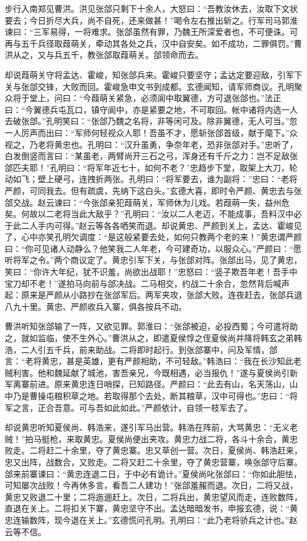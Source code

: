 步行入南郑见曹洪。洪见张郃只剩下十余人，大怒曰：“吾教汝休去，汝取下文状要去；今日折尽大兵，尚不自死，还来做甚！”喝令左右推出斩之。行军司马郭淮谏曰：“三军易得，一将难求。张郃虽然有罪，乃魏王所深爱者也，不可便诛。可再与五千兵径取葭萌关，牵动其各处之兵，汉中自安矣。如不成功，二罪俱罚。”曹洪从之，又与兵五千，教张郃取葭萌关。郃领命而去。

却说葭萌关守将孟达、霍峻，知张郃兵来。霍峻只要坚守；孟达定要迎敌，引军下关与张郃交锋，大败而回。霍峻急申文书到成都。玄德闻知，请军师商议。孔明聚众将于堂上，问曰：“今葭萌关紧急，必须阆中取翼德，方可退张郃也。”法正曰：“今翼德兵屯瓦口，镇守阆中，亦是紧要之地，不可取回。帐中诸将内选一人去破张郃。”孔明笑曰：“张郃乃魏之名将，非等闲可及。除非翼德，无人可当。”忽一人厉声而出曰：“军师何轻视众人耶！吾虽不才，愿斩张郃首级，献于麾下。”众视之，乃老将黄忠也。孔明曰：“汉升虽勇，争奈年老，恐非张郃对手。”忠听了，白发倒竖而言曰：“某虽老，两臂尚开三石之弓，浑身还有千斤之力：岂不足敌张郃匹夫耶！”孔明曰：“将军年近七十，如何不老？”忠趋步下堂，取架上大刀，轮动如飞；壁上硬弓，连拽折两张。孔明曰：“将军要去，谁为副将：”忠曰：“老将严颜，可同我去。但有疏虞，先纳下这白头。”玄德大喜，即时令严颜、黄忠去与张郃交战。赵云谏曰：“今张郃亲犯葭萌关，军师休为儿戏。若葭萌一失，益州危矣。何故以二老将当此大敌乎？”孔明曰：“汝以二人老迈，不能成事，吾料汉中必于此二人手内可得。”赵云等各各哂笑而退。却说黄忠、严颜到关上，孟达、霍峻见了，心中亦笑孔明欠调度：“是这般紧要去处，如何只教两个老的来！”黄忠谓严颜曰：“你可见诸人动静么？他笑我二人年老，今可建奇功，以服众心。”严颜曰：“愿听将军之令。”两个商议定了。黄忠引军下关，与张郃对阵。张郃出马，见了黄忠，笑曰：“你许大年纪，犹不识羞，尚欲出战耶！”忠怒曰：“竖子欺吾年老！吾手中宝刀却不老！”遂拍马向前与郃决战。二马相交，约战二十余合，忽然背后喊声起：原来是严颜从小路抄在张郃军后。两军夹攻，张郃大败。连夜赶去，张郃兵退八九十里。黄忠、严颜收兵入寨，俱各按兵不动。

曹洪听知张郃输了一阵，又欲见罪。郭淮曰：“张郃被迫，必投西蜀；今可遣将助之，就如监临，使不生外心。”曹洪从之，即遣夏侯惇之侄夏侯尚并降将韩玄之弟韩浩，二人引五千兵，前来助战。二将即时起行。到张郃寨中，问及军情，郃言：“老将黄忠，甚是英雄，更有严颜相助，不可轻敌。”韩浩曰：“我在长沙知此老贼利害。他和魏延献了城池，害吾亲兄，今既相遇，必当报仇！”遂与夏侯尚引新军离寨前进。原来黄忠连日哨探，已知路径。严颜曰：“此去有山，名天荡山，山中乃是曹操屯粮积草之地。若取得那个去处，断其粮草，汉中可得也。”忠曰：“将军之言，正合吾意。可与吾如此如此。”严颜依计，自领一枝军去了。

却说黄忠听知夏侯尚、韩浩来，遂引军马出营。韩浩在阵前，大骂黄忠：“无义老贼！”拍马挺枪，来取黄忠。夏侯尚便出夹攻。黄忠力战二将，各斗十余合，黄忠败走。二将赶二十余里，夺了黄忠寨。忠又草创一营。次日，夏侯尚、韩浩赶来，忠又出阵，战数合，又败走。二将又赶二十余里，夺了黄忠营寨，唤张郃守后寨。郃来前寨谏曰：“黄忠连退二日，于中必有诡计。”夏侯尚叱张郃曰：“你如此胆怯，可知屡次战败！今再休多言，看吾二人建功！”张郃羞赧而退。次日，二将又战，黄忠又败退二十里；二将迤逦赶上。次日，二将兵出，黄忠望风而走，连败数阵，直退在关上。二将扣关下寨，黄忠坚守不出。孟达暗暗发书，申报玄德，说：“黄忠连输数阵，现今退在关上。”玄德慌问孔明。孔明曰：“此乃老将骄兵之计也。”赵云等不信。

